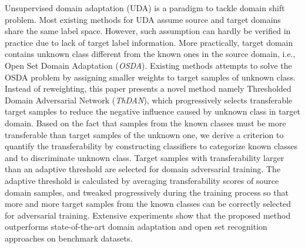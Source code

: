 Unsupervised domain adaptation (UDA) is a paradigm to tackle domain shift problem.
Most existing methods for UDA assume source and target domains share the same label space.
However, such assumption can hardly be verified in practice due to lack of target label information.
More practically, target domain contains unknown class different from the known ones in the source domain, i.e., Open Set Domain Adaptation (\textit{OSDA}).
Existing methods attempts to solve the OSDA problem by assigning smaller weights to target samples of unknown class.
Instead of reweighting, this paper presents a novel method namely Thresholded Domain Adversarial Network (\textit{ThDAN}), which progressively selects transferable target samples to reduce the negative influence caused by unknown class in target domain.
Based on the fact that samples from the known classes must be more transferable than target samples of the unknown one, we derive a criterion to quantify the transferability by constructing classifiers to categorize known classes and to discriminate unknown class.
Target samples with transferability larger than an adaptive threshold are selected for domain adversarial training. 
The adaptive threshold is calculated by averaging transferability scores of source domain samples, and tweaked progressively during the training process so that more and more target samples from the known classes can be correctly selected for adversarial training.
Extensive experiments show that the proposed method outperforms state-of-the-art domain adaptation and open set recognition approaches on benchmark datasets.

